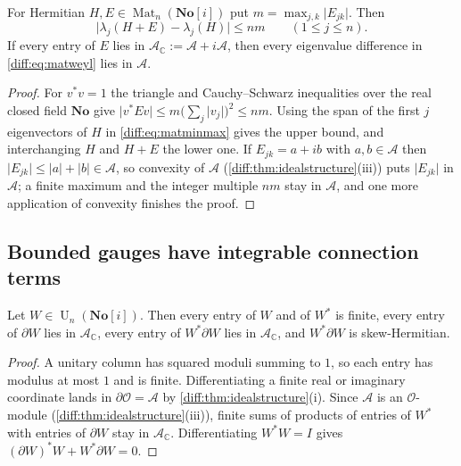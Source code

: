 \documentclass[11pt,letterpaper]{article}
\numberwithin{equation}{section}
\theoremstyle{definition}
\theoremstyle{remark}
\newcommand{\No}{\mathbf{No}}
\newcommand{\SC}{\mathbf{No}[i]}
\newcommand{\C}{\mathbb C}
\newcommand{\der}{\partial}
\newcommand{\Ofin}{\mathcal O}
\newcommand{\Acl}{\mathcal A}
\newcommand{\Mat}{\operatorname{Mat}}
\newcommand{\Un}{\operatorname{U}}
\newcommand{\abs}[1]{\lvert#1\rvert}
\begin{document}
\begin{lemma}
\label{diff:lem:matweyl}
For Hermitian $H,E\in\Mat_{n}(\SC)$ put $m=\max_{j,k}\abs{E_{jk}}$. Then
\begin{equation}\label{diff:eq:matweyl}
 \abs{\lambda_{j}(H+E)-\lambda_{j}(H)}\leq nm
 \qquad(1\leq j\leq n).
\end{equation}
If every entry of $E$ lies in $\Acl_{\C}:=\Acl+i\Acl$, then every eigenvalue
difference in \cref{diff:eq:matweyl} lies in $\Acl$.
\end{lemma}
\begin{proof}
For $v^{*}v=1$ the triangle and Cauchy--Schwarz inequalities over the real
closed field $\No$ give
$\abs{v^{*}Ev}\leq m\bigl(\sum_{j}\abs{v_{j}}\bigr)^{2}\leq nm$. Using the
span of the first $j$ eigenvectors of $H$ in \cref{diff:eq:matminmax} gives the
upper bound, and interchanging $H$ and $H+E$ the lower one. If
$E_{jk}=a+ib$ with $a,b\in\Acl$ then $\abs{E_{jk}}\leq\abs a+\abs b\in\Acl$,
so convexity of $\Acl$ (\cref{diff:thm:idealstructure}(iii)) puts
$\abs{E_{jk}}$ in $\Acl$; a finite maximum and the integer multiple $nm$ stay
in $\Acl$, and one more application of convexity finishes the proof.
\end{proof}

\subsection{Bounded gauges have integrable connection terms}
\label{diff:sub:matboundedgauge}

\begin{lemma}
\label{diff:lem:matboundedgauge}
Let $W\in\Un_{n}(\SC)$. Then every entry of $W$ and of $W^{*}$ is finite,
every entry of $\der W$ lies in $\Acl_{\C}$, every entry of $W^{*}\der W$ lies
in $\Acl_{\C}$, and $W^{*}\der W$ is skew-Hermitian.
\end{lemma}
\begin{proof}
A unitary column has squared moduli summing to $1$, so each entry has modulus
at most $1$ and is finite. Differentiating a finite real or imaginary
coordinate lands in $\der\Ofin=\Acl$ by
\cref{diff:thm:idealstructure}(i). Since $\Acl$ is an $\Ofin$-module
(\cref{diff:thm:idealstructure}(iii)), finite sums of products of entries of
$W^{*}$ with entries of $\der W$ stay in $\Acl_{\C}$. Differentiating
$W^{*}W=I$ gives $(\der W)^{*}W+W^{*}\der W=0$.
\end{proof}
\end{document}
